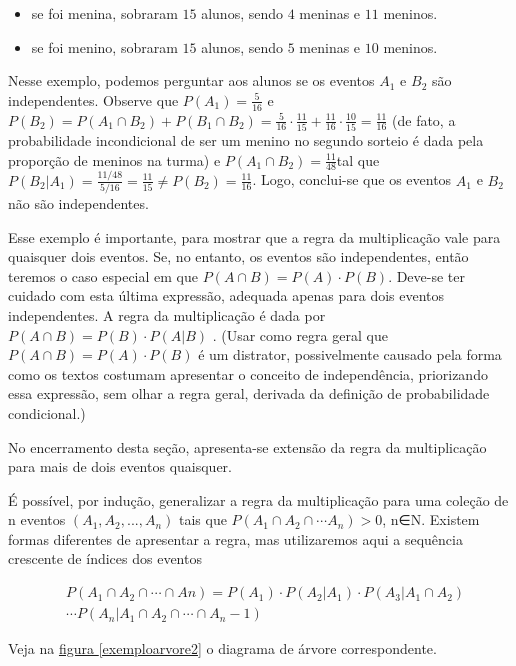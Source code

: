 \begin{paginatexto}
\begin{itemize}
\item se foi menina, sobraram $15$ alunos, sendo $4$ meninas e $11$ meninos.
\item se foi menino, sobraram $15$ alunos, sendo $5$ meninas e $10$ meninos.
\end{itemize}

Nesse exemplo, podemos perguntar aos alunos se os eventos $A_1$ e $B_2$ são independentes. Observe que $P(A_1)=\frac{5}{16}$ e $P(B_2)=P(A_1\cap B_2)+P(B_1\cap B_2)=\frac{5}{16}\cdot \frac{11}{15}+\frac{11}{16}\cdot\frac{10}{15}=\frac{11}{16}$ (de fato, a probabilidade incondicional de ser um menino no segundo sorteio é dada pela proporção de meninos na turma) e $P(A_1\cap B_2)=\frac{11}{48} $tal que $P(B_2|A_1)=\frac{11/48}{5/16}=\frac{11}{15}\neq P(B_2)=\frac{11}{16}$. Logo, conclui-se que os eventos $A_1$ e $B_2$ não são independentes.

Esse exemplo é importante, para mostrar que a regra da multiplicação vale para quaisquer dois eventos. Se, no entanto, os eventos são independentes, então teremos o caso especial em que $P(A\cap B)=P(A)\cdot P(B)$. Deve-se ter cuidado com esta última expressão, adequada apenas para dois eventos independentes. A regra da multiplicação é dada por $P(A\cap B)=P(B)\cdot P(A|B)$ . (Usar como regra geral que $P(A\cap B)=P(A)\cdot P(B)$ é um distrator, possivelmente causado pela forma como os textos costumam apresentar o conceito de independência, priorizando essa expressão, sem olhar a regra geral, derivada da definição de probabilidade condicional.)

No encerramento desta seção, apresenta-se extensão da regra da multiplicação para mais de dois eventos quaisquer.

É possível, por indução, generalizar a regra da multiplicação para uma coleção de n eventos $(A_1,A_2,...,A_n)$ tais que $P(A_1\cap A_2\cap \cdots A_n)>0$, n∈N. Existem formas diferentes de apresentar a regra, mas utilizaremos aqui a sequência crescente de índices dos eventos

{\small
\begin{align*}
&P(A_1\cap A_2\cap \cdots\cap An)=P(A_1)\cdot P(A_2|A_1)\cdot P(A_3|A_1\cap A_2)\\
&\cdots P(A_n|A_1\cap A_2\cap\cdots\cap A_n−1)
\end{align*}}

Veja na \hyperref[exemploarvore2]{figura \ref{exemploarvore2}} o diagrama de árvore correspondente.
\begin{figure}[H]
\centering


\end{figure}
\end{paginatexto}
